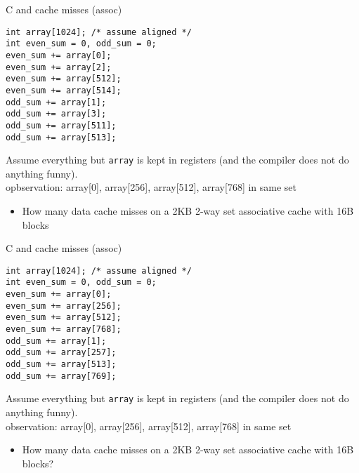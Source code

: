 \begin{frame}[fragile,label=arrayMissesAssocBig1]{C and cache misses (assoc)}
\begin{lstlisting}[style=smaller]
int array[1024]; /* assume aligned */
int even_sum = 0, odd_sum = 0;
even_sum += array[0];
even_sum += array[2];
even_sum += array[512];
even_sum += array[514];
odd_sum += array[1];
odd_sum += array[3];
odd_sum += array[511];
odd_sum += array[513];
\end{lstlisting}
{\small
Assume everything but {\tt array} is kept in registers (and the compiler does not do
anything funny).\\
opbservation: array[0], array[256], array[512], array[768] in same set}
\begin{itemize}
\item How many data cache misses on a 2KB 2-way set associative cache with 16B blocks
\end{itemize}
\end{frame}

\begin{frame}[fragile,label=arrayMissesAssocBig2]{C and cache misses (assoc)}
\begin{lstlisting}[style=smaller]
int array[1024]; /* assume aligned */
int even_sum = 0, odd_sum = 0;
even_sum += array[0];
even_sum += array[256];
even_sum += array[512];
even_sum += array[768];
odd_sum += array[1];
odd_sum += array[257];
odd_sum += array[513];
odd_sum += array[769];
\end{lstlisting}
{\small
Assume everything but {\tt array} is kept in registers (and the compiler does not do
anything funny).\\
observation: array[0], array[256], array[512], array[768] in same set}
\begin{itemize}
\item How many data cache misses on a 2KB 2-way set associative cache with 16B blocks?
\end{itemize}
\end{frame}
